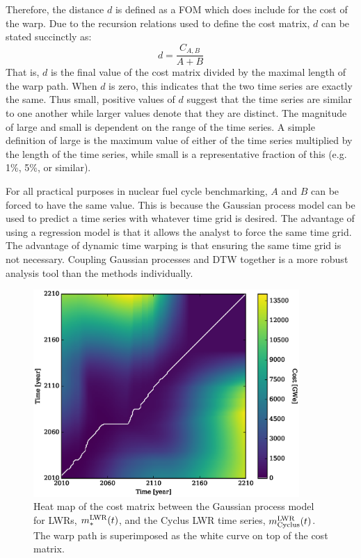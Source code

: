 Therefore, the distance $d$ is defined as a FOM which does include for the cost of the
warp.  Due to the recursion relations used to define the cost matrix, $d$ can be 
stated succinctly as:
\begin{equation}
\label{d-calc}
d = \frac{C_{A,B}}{A + B}
\end{equation}
That is, $d$ is the final value of the cost matrix divided by the maximal length 
of the warp path. When $d$ is zero, this indicates that the two time series
are exactly the same. Thus small, positive values of $d$ suggest that the 
time series are similar to one another while larger values denote that they 
are distinct. The magnitude of large and small is dependent on the range of 
the time series. A simple definition of large is the maximum 
value of either of the time series multiplied by the length of the time series, 
while small is a representative fraction of this (e.g. 1\%, 5\%, or similar).

For all practical purposes in nuclear fuel cycle benchmarking, $A$ and $B$ can be 
forced to have the same
value. This is because the Gaussian process model can be used to predict a time series 
with whatever time grid is desired.  The advantage of using a regression model 
is that it allows the analyst to force the same time grid.  The advantage of 
dynamic time warping is that ensuring the same time grid is not necessary.
Coupling Gaussian processes and DTW together is a more robust analysis tool 
than the methods individually.

\begin{figure}[htb]
\centering
\includegraphics[width=0.9\textwidth]{cost-lwr-model-to-lwr-cyclus.eps}
\caption{Heat map of the cost matrix between the Gaussian process model 
for LWRs, $m_*^{\mathrm{LWR}}(t)$, and the Cyclus LWR time series, $m_{\mathrm{Cyclus}}^{\mathrm{LWR}}(t)$.
The warp path is superimposed as the white curve on top of the cost matrix.}
\label{cost-lwr-model-to-lwr-cyclus}
\end{figure}

